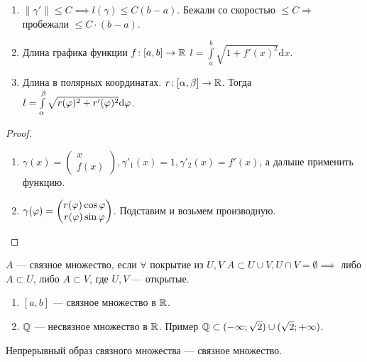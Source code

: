 \begin{consequence}
    \begin{enumerate}
        \item $\| \gamma' \| \le C \implies l(\gamma) \le C(b-a)$. Бежали со скоростью $\le C \Rightarrow$ пробежали $\le C\cdot (b - a)$.
        \item Длина графика функции $f\!: [a, b] \to \mathbb{R}$  $l = \int\limits_a^b \sqrt{1 + f'(x)^2} \mathrm{d}x$.
        \item Длина в полярных координатах. $r\!: [\alpha, \beta] \to \mathbb{R}$. Тогда  $l = \int\limits_\alpha^\beta \sqrt{r(\varphi)^2 + r'(\varphi)^2} \mathrm{d}\varphi$. 
    \end{enumerate}
\end{consequence}
\begin{proof}
    \begin{enumerate}
        \addtocounter{enumi}{1}
        \item $\gamma(x) = \begin{pmatrix} x \\ f(x) \end{pmatrix}, \gamma'_1(x) = 1, \gamma'_2(x) = f'(x)$, а дальше применить функцию.
        \item $\gamma(\varphi) = \begin{pmatrix} r(\varphi)\cos \varphi \\ r(\varphi) \sin \varphi \end{pmatrix} $. Подставим и возьмем производную.
    \end{enumerate}
\end{proof}
\begin{definition}
    $A$ --- связное множество, если  $\forall$ покрытие из $U, V$  $A \subset U \cup V, U \cap V = \emptyset \implies $ либо  $A \subset U$, либо  $A \subset V$, где $U, V$ --- открытые.
\end{definition}
\begin{example}
    \begin{enumerate}
        \item $[a, b]$ --- связное множество в  $\mathbb{R}$.
        \item  $\mathbb{Q}$ --- несвязное множество в  $\mathbb{R}$. Пример  $\mathbb{Q} \subset (-\infty; \sqrt{2}) \cup (\sqrt{2}; +\infty)$.
    \end{enumerate}
\end{example}
\begin{theorem}
    Непрерывный образ связного множества --- связное множество.
\end{theorem}
